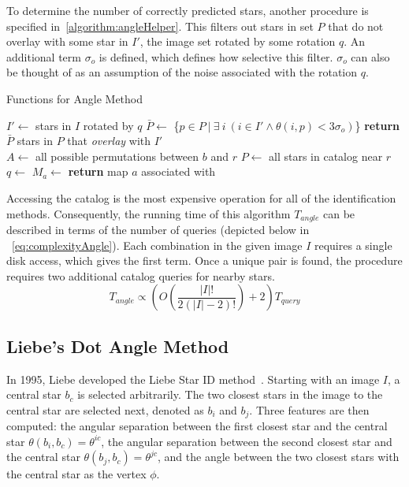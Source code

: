 To determine the number of correctly predicted stars, another procedure is specified in~\autoref{algorithm:angleHelper}.
This filters out stars in set $P$ that do not overlay with some star in $I'$, the image set rotated by some rotation
$q$.
An additional term $\sigma_o$ is defined, which defines how selective this filter.
$\sigma_o$ can also be thought of as an assumption of the noise associated with the rotation $q$.

\begin{algorithm}
    \caption{Functions for Angle Method}\label{algorithm:angleHelper}
    \begin{algorithmic}[1]
        \State $I' \gets$ stars in $I$ rotated by $q$
        \State $\bar{P} \gets $ \{$p \in P \ | \ \exists \ i \ (i \in I' \land \theta (i, p) < 3\sigma_o)$\}
        \State \textbf{return} $\bar{P}$ \Comment stars in $P$ that \textit{overlay} with $I'$
        \EndFunction
        \\
        \State $A \gets $ all possible permutations between $b$ and $r$
        \State $P \gets $ all stars in catalog near $r$
        \\
        \State $q \gets $ 
        \State $M_a \gets $ 
        \EndFor
        \State \textbf{return} map $a$ associated with 
        \EndFunction
    \end{algorithmic}
\end{algorithm}

Accessing the catalog is the most expensive operation for all of the identification methods.
Consequently, the running time of this algorithm $T_{angle}$ can be described in terms of the number of queries
(depicted below in ~\autoref{eq:complexityAngle}).
Each combination in the given image $I$ requires a single disk access, which gives the first term.
Once a unique pair is found, the  procedure requires two additional catalog queries for nearby stars.
\begin{equation}\label{eq:complexityAngle}
    T_{angle} \propto \left( O\left( \frac{|I|!}{2\left( |I| - 2 \right)!} \right) + 2 \right) T_{query}
\end{equation}

\subsection{Liebe's Dot Angle Method}\label{subsec:liebe'sDotAngleMethod}
In 1995, Liebe developed the Liebe Star ID method~\cite{Survey,AnalysisUncompensated}.
Starting with an image $I$, a central star $b_c$ is selected arbitrarily.
The two closest stars in the image to the central star are selected next, denoted as $b_i$ and $b_j$.
Three features are then computed: the angular separation between the first closest star and the central star $\theta
(b_i, b_c) = \theta^{ic}$, the angular separation between the second closest star and the central star $\theta (b_j,
b_c) = \theta^{jc}$, and the angle between the two closest stars with the central star as the vertex $\phi$.

